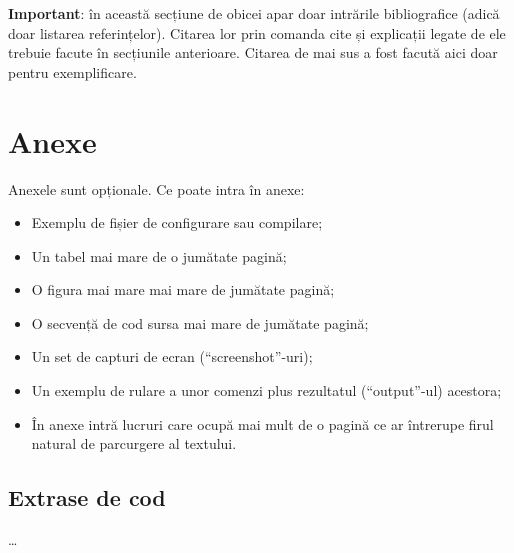 \documentclass[12pt,a4paper]{report}
\begin{document}
\textbf{Important}: în această secțiune de obicei apar doar intrările bibliografice (adică doar listarea referințelor). Citarea lor prin comanda cite și explicații legate de ele trebuie facute în secțiunile anterioare. Citarea de mai sus a fost facută aici doar pentru exemplificare.







\chapter*{Anexe}

Anexele sunt opționale.
Ce poate intra în anexe:
\begin{itemize}
\item	Exemplu de fișier de configurare sau compilare;
\item	Un tabel mai mare de o jumătate pagină;
\item	O figura mai mare mai mare de jumătate pagină;
\item	O secvență de cod sursa mai mare de jumătate pagină;
\item	Un set de capturi de ecran (``screenshot''-uri);
\item	Un exemplu de rulare a unor comenzi plus rezultatul (``output''-ul) acestora;
\item 	În anexe intră lucruri care ocupă mai mult de o pagină ce ar întrerupe firul natural de parcurgere al textului.
\end{itemize}

\begin{appendices}

\chapter{Extrase de cod} %
\ldots


\end{appendices}
\end{document}
